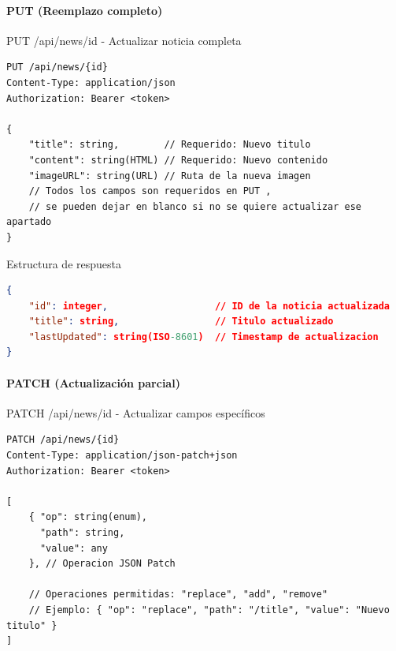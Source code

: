 \documentclass[11pt,a4paper]{article}
\begin{document}
\paragraph{PUT (Reemplazo completo)}
\begin{center}
	\begin{minipage}{\textwidth}
		\begin{codebox}{PUT /api/news/{id} - Actualizar noticia completa}
			\begin{lstlisting}[language=HTTP]
PUT /api/news/{id}
Content-Type: application/json
Authorization: Bearer <token>

{
    "title": string,        // Requerido: Nuevo titulo
    "content": string(HTML) // Requerido: Nuevo contenido
    "imageURL": string(URL) // Ruta de la nueva imagen
    // Todos los campos son requeridos en PUT , 
    // se pueden dejar en blanco si no se quiere actualizar ese apartado
}
\end{lstlisting}
		\end{codebox}
	\end{minipage}
\end{center}

\begin{center}
	\begin{minipage}{\textwidth}
		\begin{codebox}{Estructura de respuesta}
			\begin{lstlisting}[language=json]
{
    "id": integer,                   // ID de la noticia actualizada
    "title": string,                 // Titulo actualizado
    "lastUpdated": string(ISO-8601)  // Timestamp de actualizacion
}
\end{lstlisting}
		\end{codebox}
	\end{minipage}
\end{center}

\paragraph{PATCH (Actualización parcial)}
\begin{center}
	\begin{minipage}{\textwidth}
		\begin{codebox}{PATCH /api/news/{id} - Actualizar campos específicos}
			\begin{lstlisting}[language=HTTP]
PATCH /api/news/{id}
Content-Type: application/json-patch+json
Authorization: Bearer <token>

[
    { "op": string(enum), 
      "path": string, 
      "value": any 
    }, // Operacion JSON Patch

    // Operaciones permitidas: "replace", "add", "remove"
    // Ejemplo: { "op": "replace", "path": "/title", "value": "Nuevo titulo" }
]
\end{lstlisting}
		\end{codebox}
	\end{minipage}
\end{center}
\end{document}
